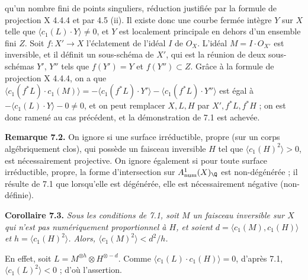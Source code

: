 
qu'un
nombre fini de points singuliers, r\'eduction justifi\'ee par la formule de projection X 4.4.4 et par 4.5 (ii). Il existe donc une courbe ferm\'ee int\`egre $Y$ sur $X$ telle que $\langle c_1(L)\cdot Y\rangle\ne0$, et $Y$ est localement principale en dehors d'un ensemble fini $Z$. Soit $f:X'\to X$ l'\'eclatement de l'id\'eal $I$ de ${O}_X$. L'id\'eal $M=I\cdot{O}_{X'}$ est inversible, et il d\'efinit un sous-sch\'ema de $X'$, qui est la r\'eunion de deux sous-sch\'emas $Y'$, $Y''$ tels que $f(Y')=Y$ et $f(Y'')\subset Z$. Gr\^ace \`a la formule de projection X 4.4.4, on a que $\langle c_1(f^*L)\cdot c_1(M)\rangle=-\langle c_1(f^*L)\cdot Y'\rangle-\langle c_1(f^*L)\cdot Y''\rangle$ est \'egal \`a $-\langle c_1(L)\cdot Y\rangle-0\ne0$, et on peut remplacer $X,L,H$ par $X',f^*L,f^*H$ ; on est donc ramen\'e au cas pr\'ec\'edent, et la d\'emonstration de 7.1 est achev\'ee.

\textbf{Remarque 7.2.} On ignore si une surface irr\'eductible, propre (sur un corps alg\'ebriquement clos), qui poss\`ede un faisceau inversible $H$ tel que $\langle c_1(H)^2\rangle>0$, est n\'ecessairement projective. On ignore \'egalement si pour toute surface irr\'eductible, propre, la forme d'intersection sur $A^1_{\mathrm{num}}(X)_{\Q}$ est non-d\'eg\'en\'er\'ee ; il r\'esulte de 7.1 que lorsqu'elle est d\'eg\'en\'er\'ee, elle est n\'ecessairement n\'egative (non-d\'efinie).

\textbf{Corollaire 7.3.} \emph{Sous les conditions de 7.1, soit $M$ un faisceau inversible sur $X$ qui n'est pas num\'eriquement proportionnel \`a $H$, et soient $d=\langle c_1(M),c_1(H)\rangle$ et $h=\langle c_1(H)^2\rangle$. Alors, $\langle c_1(M)^2\rangle<d^2/h$.}

En effet, soit $L=M^{\otimes h}\otimes H^{\otimes -d}$. Comme $\langle c_1(L)\cdot c_1(H)\rangle=0$, d'apr\`es 7.1, $\langle c_1(L)^2\rangle<0$ ; d'o\`u l'assertion.

